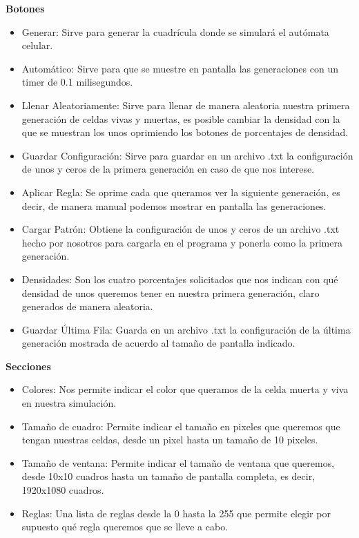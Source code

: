 \documentclass{article}
\begin{document}
	\textbf{Botones}
	\begin{itemize}
		\item Generar: Sirve para generar la cuadrícula donde se simulará el autómata celular. 
		\item Automático: Sirve para que se muestre en pantalla las generaciones con un timer de 0.1 milisegundos.
		\item Llenar Aleatoriamente: Sirve para llenar de manera aleatoria nuestra primera generación de celdas vivas y muertas, es posible cambiar la densidad con la que se muestran los unos oprimiendo los botones de porcentajes de densidad. 
		\item Guardar Configuración: Sirve para guardar en un archivo .txt la configuración de unos y ceros de la primera generación en caso de que nos interese. 
		\item Aplicar Regla: Se oprime cada que queramos ver la siguiente generación, es decir, de manera manual podemos mostrar en pantalla las generaciones. 
		\item Cargar Patrón: Obtiene la configuración de unos y ceros de un archivo .txt hecho por nosotros para cargarla en el programa y ponerla como la primera generación. 
		\item Densidades: Son los cuatro porcentajes solicitados que nos indican con qué densidad de unos queremos tener en nuestra primera generación, claro generados de manera aleatoria. 
		\item Guardar Última Fila: Guarda en un archivo .txt la configuración de la última generación mostrada de acuerdo al tamaño de pantalla indicado. 
	\end{itemize}
	
	\textbf{Secciones}
	\begin{itemize}
		\item Colores: Nos permite indicar el color que queramos de la celda muerta y viva en nuestra simulación. 
		\item Tamaño de cuadro: Permite indicar el tamaño en pixeles que queremos que tengan nuestras celdas, desde un pixel hasta un tamaño de 10 pixeles. 
		\item Tamaño de ventana: Permite indicar el tamaño de ventana que queremos, desde 10x10 cuadros hasta un tamaño de pantalla completa, es decir, 1920x1080 cuadros. 
		\item Reglas: Una lista de reglas desde la 0 hasta la 255 que permite elegir por supuesto qué regla queremos que se lleve a cabo. 
		
	\end{itemize}
	
\end{document}
